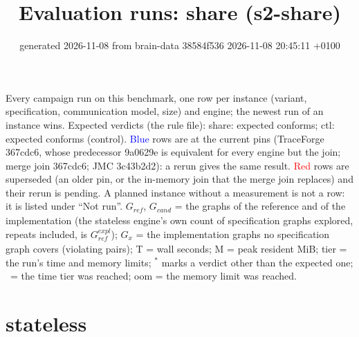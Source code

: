 \documentclass[10pt]{article}
\title{Evaluation runs: \textsf{share} (s2-share)}
\author{}
\date{generated 2026-11-08 from brain-data 38584f536 2026-11-08 20:45:11 +0100}
\begin{document}
\maketitle\small
\noindent Every campaign run on this benchmark, one row per instance (variant, specification, communication model, size) and engine; the newest run of an instance wins. Expected verdicts (the rule file): share: expected conforms; ctl: expected conforms (control). \textcolor{blue}{Blue} rows are at the current pins (TraceForge 367cdc6, whose predecessor 9a0629e is equivalent for every engine but the join; merge join 367cdc6; JMC 3c43b2d2): a rerun gives the same result. \textcolor{red}{Red} rows are superseded (an older pin, or the in-memory join that the merge join replaces) and their rerun is pending. A planned instance without a measurement is not a row: it is listed under ``Not run''. $G_{\mathit{ref}}$, $G_{\mathit{cand}}$ = the graphs of the reference and of the implementation (the stateless engine's own count of specification graphs explored, repeats included, is $G_{\mathit{ref}}^{\mathit{expl}}$); $G_x$ = the implementation graphs no specification graph covers (violating pairs); T = wall seconds; M = peak resident MiB; tier = the run's time and memory limits; $^{\ast}$ marks a verdict other than the expected one; \faClock\ = the time tier was reached; oom = the memory limit was reached.

\section*{stateless}
\end{document}

